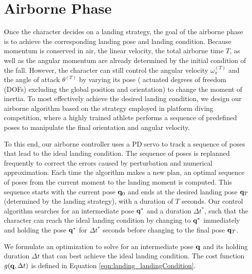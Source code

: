 \section{Airborne Phase}
Once the character decides on a landing strategy, the goal of the
airborne phase is to achieve the corresponding landing pose and
landing condition. Because momentum is conserved in air, the linear
velocity, the total airborne time $T$, as well as the angular momentum
are already determined by the initial condition of the fall.  However,
the character can still control the angular velocity $\omega_x^{(T)}$
and the angle of attack $\theta^{(T)}$ by varying its pose (\ie
actuated degrees of freedom (DOFs) excluding the global position and
orientation) to change the moment of inertia. To most effectively
achieve the desired landing condition, we design our airborne
algorithm based on the strategy employed in platform diving
competition, where a highly trained athlete performs a sequence of
predefined poses to manipulate the final orientation and angular
velocity.

To this end, our airborne controller uses a PD servo to track a
sequence of poses that lead to the ideal landing condition. 
The sequence of poses is replanned frequently to correct the errors
caused by perturbation and numerical approximation. Each time the
algorithm makes a new plan, an optimal sequence of poses from the
current moment to the landing moment is computed. This sequence
starts with the current pose $\mathbf{q}_0$ and ends at the desired
landing pose $\mathbf{q}_T$ (determined by the landing strategy), with a
duration of $T$ seconds. Our control algorithm searches for an
intermediate pose $\mathbf{q}^*$ and a duration $\Delta t^*$, such that
the character can reach the ideal landing condition by changing to
$\mathbf{q}^*$ immediately and holding the pose $\mathbf{q}^*$ for $\Delta
t^*$ seconds before changing to the final pose $\mathbf{q}_T$.

We formulate an optimization to solve for an intermediate pose $\mathbf{q}$
and its holding duration $\Delta t$ that can best achieve the ideal
landing condition. The cost function  $g(\mathbf{q}, \Delta t)$ is defined
in Equation \ref{eqn:landing_landingCondition}.

